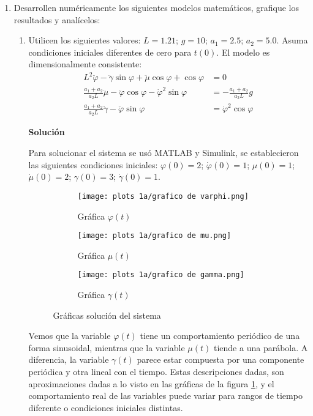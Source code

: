 \documentclass[letterpaper, 12pt]{article}
\begin{document}
\begin{enumerate}
\item Desarrollen numéricamente los siguientes modelos matemáticos, grafique los resultados y analícelos:
\begin{enumerate}
\item Utilicen los siguientes valores:
$L = 1.21$; $g = 10$; $a_1 = 2.5$; $a_2 = 5.0$. Asuma condiciones iniciales diferentes de cero para $t(0)$. El modelo es dimensionalmente consistente:
\begin{equation}
\begin{split}
    L^2\ddot{\varphi} - \ddot{\gamma}\sin \varphi + \ddot{\mu}\cos \varphi + \cos \varphi &= 0 \\
    \frac{a_1+a_2}{a_2L}\ddot{\mu} - \ddot{\varphi}\cos \varphi - \dot{\varphi}^2\sin \varphi &= - \frac{a_1+a_2}{a_2L}g \\
    \frac{a_1+a_2}{a_2L}\ddot{\gamma} - \ddot{\varphi}\sin \varphi &= \dot{\varphi}^2\cos \varphi
\end{split}
\end{equation}

\textbf{Solución}

Para solucionar el sistema se usó MATLAB y Simulink, se establecieron las siguientes condiciones iniciales:
$\varphi(0) = 2$; $\dot{\varphi}(0) = 1$; $\mu(0) = 1$; $\dot{\mu}(0) = 2$; $\gamma(0) = 3$; $\dot{\gamma}(0) = 1$.

\begin{figure}[H]
    \centering
    \hspace{1cm}
    \begin{subfigure}[h]{0.45\linewidth}
        \texttt{[image: plots 1a/grafico de varphi.png]}
        \caption{\centering Gráfica $\varphi(t)$}
    \end{subfigure}
    \begin{subfigure}[h]{0.45\linewidth}
        \texttt{[image: plots 1a/grafico de mu.png]}
        \caption{\centering Gráfica $\mu(t)$}
    \end{subfigure}
    \begin{subfigure}[h]{0.45\linewidth}
        \texttt{[image: plots 1a/grafico de gamma.png]}
        \caption{\centering Gráfica $\gamma(t)$}
    \end{subfigure}
    \caption{Gráficas solución del sistema}
    \label{fig:graficas solucion del sistema 1a}
\end{figure}

Vemos que la variable $\varphi(t)$ tiene un comportamiento periódico de una forma sinusoidal, mientras que la variable $\mu(t)$ tiende a una parábola. A diferencia, la variable $\gamma(t)$ parece estar compuesta por una componente periódica y otra lineal con el tiempo.
Estas descripciones dadas, son aproximaciones dadas a lo visto en las gráficas de la figura \ref{fig:graficas solucion del sistema 1a}, y el comportamiento real de las variables puede variar para rangos de tiempo diferente o condiciones iniciales distintas.







\end{enumerate}
\end{enumerate}
\end{document}
